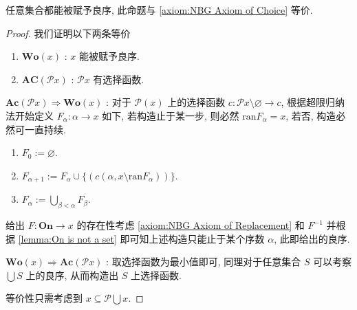 \begin{theorem*}
     \label{theorem:well-ordering theorem}
    任意集合都能被赋予良序, 此命题与 \ref{axiom:NBG Axiom of Choice} 等价.

    \begin{proof}
        我们证明以下两条等价
        \begin{enumerate}
            \item \(\mathbf{Wo} (x)\) : \(x\) 能被赋予良序.
            \item \(\mathbf{AC} (\mathcal{P} x)\) : \(\mathcal{P} x\) 有选择函数.
        \end{enumerate}

        \(\mathbf{Ac} (\mathcal{P}x) \Rightarrow \mathbf{Wo} (x)\) : 对于 \(\mathcal{P} (x)\) 上的选择函数 \(c : \mathcal{P}x \setminus {\varnothing} \to c\),
        根据超限归纳法开始定义 \(F_\alpha : \alpha \to x\) 如下, 若构造止于某一步, 则必然 \(\mathrm{ran} F_\alpha = x\), 若否, 构造必然可一直持续.

        \begin{enumerate}
            \item \(F_0 := \varnothing\).
            \item \(F_{\alpha + 1} := F_\alpha \cup \{(c (\alpha,x \setminus \mathrm{ran} F_\alpha))\}\).
            \item \(F_\alpha := \bigcup_{\beta < \alpha} F_\beta\).
        \end{enumerate}

        给出 \(F : \mathbf{On} \to x\) 的存在性考虑 \ref{axiom:NBG Axiom of Replacement} 和 \(F^{-1}\) 并根据 \ref{lemma:On is not a set} 即可知上述构造只能止于某个序数 \(\alpha\), 此即给出的良序.

        \(\mathbf{Wo} (x) \Rightarrow \mathbf{Ac} (\mathcal{P}x)\) : 取选择函数为最小值即可, 同理对于任意集合 \(S\) 可以考察 \(\bigcup S\) 上的良序, 从而构造出 \(S\) 上选择函数.

        等价性只需考虑到 \(x \subseteq \mathcal{P} \bigcup x\).
    \end{proof}
\end{theorem*}

